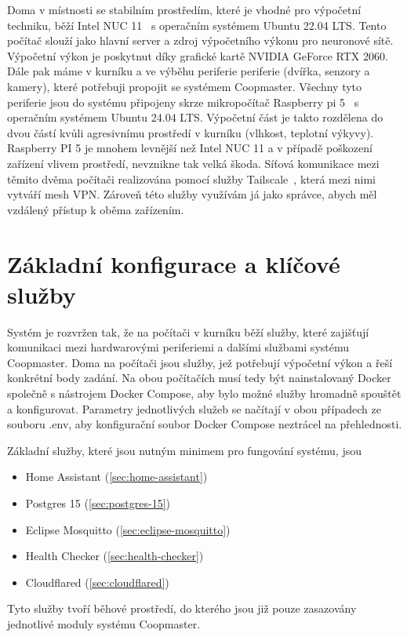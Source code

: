 Doma v místnosti se stabilním prostředím, které je vhodné pro výpočetní techniku, běží Intel NUC 11~\cite{IntelNUC11Enthusiast} s operačním systémem Ubuntu 22.04 LTS.
Tento počítač slouží jako hlavní server a zdroj výpočetního výkonu pro neuronové sítě.
Výpočetní výkon je poskytnut díky grafické kartě NVIDIA GeForce RTX 2060.\newline
Dále pak máme v kurníku a ve výběhu periferie periferie (dvířka, senzory a kamery), které potřebuji propojit se systémem Coopmaster.
Všechny tyto periferie jsou do systému připojeny skrze mikropočítač Raspberry pi 5~\cite{RaspberryPi5} s operačním systémem Ubuntu 24.04 LTS.
Výpočetní část je takto rozdělena do dvou částí kvůli agresivnímu prostředí v kurníku (vlhkost, teplotní výkyvy).
Raspberry PI 5 je mnohem levnější než Intel NUC 11 a v případě poškození zařízení vlivem prostředí, nevznikne tak velká škoda.
Síťová komunikace mezi těmito dvěma počítači realizována pomocí služby Tailscale~\cite{Tailscale}, která mezi nimi vytváří mesh VPN.
Zároveň této služby využívám já jako správce, abych měl vzdálený přístup k oběma zařízením.

\section*{Základní konfigurace a klíčové služby}


Systém je rozvržen tak, že na počítači v kurníku běží služby, které zajišťují komunikaci mezi hardwarovými periferiemi a dalšími službami systému Coopmaster.
Doma na počítači jsou služby, jež potřebují výpočetní výkon a řeší konkrétní body zadání.
Na obou počítačích musí tedy být nainstalovaný Docker společně s nástrojem Docker Compose, aby bylo možné služby hromadně spouštět a konfigurovat.
Parametry jednotlivých služeb se načítají v obou případech ze souboru .env, aby konfigurační soubor Docker Compose neztrácel na přehlednosti.\newline

Základní služby, které jsou nutným minimem pro fungování systému, jsou
\begin{itemize}
    \item Home Assistant (\ref{sec:home-assistant})
    \item Postgres 15 (\ref{sec:postgres-15})
    \item Eclipse Mosquitto (\ref{sec:eclipse-mosquitto})
    \item Health Checker (\ref{sec:health-checker})
    \item Cloudflared (\ref{sec:cloudflared})
\end{itemize}
Tyto služby tvoří běhové prostředí, do kterého jsou již pouze zasazovány jednotlivé moduly systému Coopmaster.

